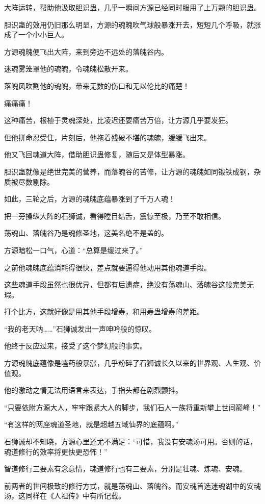 \begin{this_body}
大阵运转，帮助他汲取胆识蛊，几乎一瞬间方源已经同时服用了上万颗的胆识蛊。

胆识蛊的效用仍旧那么明显，方源的魂魄吹气球般暴涨开去，短短几个呼吸，就涨成了一个小小巨人。

方源魂魄便飞出大阵，来到旁边不远处的落魄谷内。

迷魂雾笼罩他的魂魄，令魂魄松散开来。

落魄风吹割他的魂魄，带来无数的伤口和无以伦比的痛楚！

痛痛痛！

这种痛苦，根植于灵魂深处，比凌迟还要痛苦万倍，让方源几乎要发狂。

但他拼命忍受住，片刻后，他拖着残破不堪的魂魄，缓缓飞出来。

他又飞回魂道大阵，借助胆识蛊修复，随后又是体型暴涨。

胆识蛊就像是绝世完美的营养，而落魄谷的苦修，让方源的魂魄如同锻铁成钢，杂质被尽数剔除。

如此，三轮之后，方源的魂魄底蕴暴涨到了千万人魂！

把一旁操纵大阵的石狮诚，看得瞠目结舌，震惊至极，乃至不敢相信。

荡魂山、落魄谷乃是魂修圣地，这美名绝不是盖的。

方源暗松一口气，心道：“总算是缓过来了。”

之前他魂魄底蕴消耗得很快，差点就要逼得他动用其他魂道手段。

这些魂道手段虽然也很优异，但都有后遗症，绝没有荡魂山、落魄谷这般完美无瑕。

打个比方，这就好像是用其他手段增寿，和用寿蛊增寿的差距。

“我的老天呐……”石狮诚发出一声呻吟般的惊叹。

他终于反应过来，接受了这个梦幻般的事实。

方源魂魄底蕴像是嗑药般暴涨，几乎粉碎了石狮诚长久以来的世界观、人生观、价值观。

他的激动之情无法用语言来表达，手指头都在剧烈颤抖。

“只要依附方源大人，牢牢跟紧大人的脚步，我们石人一族将重新攀上世间巅峰！”

“有这样的两座魂道圣地，就是超越五域仙界的底蕴啊。”

石狮诚却不知晓，方源心里还尤不满足：“可惜，我没有安魂汤可用。否则的话，魂道修行的效率将更快更恐怖！”

智道修行三要素有念意情，魂道修行也有三要素，分别是壮魂、炼魂、安魂。

前两者的世间极致的修行方式，就是荡魂山、落魄谷。而安魂首选迷魂湖中的安魂汤，这同样在《人祖传》中有所记载。


\end{this_body}
